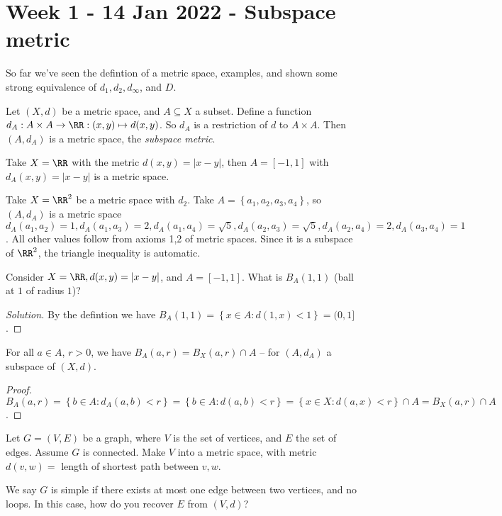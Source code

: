 \section{Week 1 - 14 Jan 2022 - Subspace metric}
So far we've seen the defintion of a metric space, examples, and shown some
strong equivalence of $d_1,d_2,d_{\infty}$, and $D$.
\begin{definition}
  Let $(X,d)$ be a metric space, and $A\subseteq X$ a subset. Define a function
  $d_A:A\times A\to\RR: (x,y)\mapsto d(x,y)$. So $d_A$ is a restriction of $d$
  to $A\times A$. Then $(A,d_A)$ is a metric space, the \emph{subspace metric}.
\end{definition}
\begin{example}
  Take $X=\RR$ with the metric $d(x,y)=|x-y|$, then $A=[-1,1]$ with
  $d_A(x,y)=|x-y|$ is a metric space.
\end{example}
\begin{example}
  Take $X=\RR^2$ be a metric space with $d_2$. Take $A=\left\{ a_1,a_2,a_3,a_4
  \right\}$, so $(A,d_A)$ is a metric space $d_A(a_1,a_2)=1, d_A(a_1,a_3)=2,
  d_A(a_1,a_4)=\sqrt{5}, d_A(a_2,a_3)=\sqrt{5}, d_A(a_2,a_4)=2, d_A(a_3,a_4)=1$.
  All other values follow from axioms 1,2 of metric spaces. Since it is a
  subspace of $\RR^2$, the triangle inequality is automatic.
\end{example}
\begin{exercise}
  Consider $X=\RR, d(x,y)=|x-y|$, and $A=[-1,1]$. What is $B_A(1,1)$ (ball at
  $1$ of radius $1$)?
\end{exercise}
\begin{proof}[Solution]
  By the defintion we have $B_A(1,1)=\left\{ x\in A : d(1,x)<1 \right\} =
  (0,1]$.
\end{proof}


\begin{proposition}
  For all $a\in A$, $r>0$, we have $B_A(a,r)=B_X(a,r)\cap A$ -- for $(A,d_A)$ a
  subspace of $(X,d)$.
\end{proposition}
\begin{proof}
  $B_A(a,r)= \left\{ b\in A : d_A(a,b)<r \right\} = \left\{ b\in A: d(a,b)<r
  \right\} =  \left\{ x\in X : d(a,x)<r \right\} \cap A = B_{X}(a,r)\cap A$.
\end{proof}

\begin{exercise}
  Let $G=(V,E)$ be a graph, where $V$ is the set of vertices, and $E$ the set of
  edges. Assume $G$ is connected. Make $V$ into a metric space, with metric
  $d(v,w)=$ length of shortest path between $v,w$.

  We say $G$ is simple if there exists at most one edge between two vertices,
  and no loops. In this case, how do you recover $E$ from $(V,d)$?
\end{exercise}

